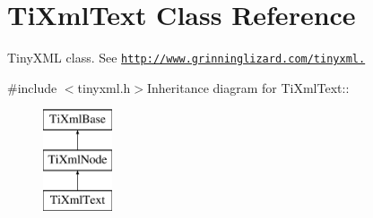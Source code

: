 \hypertarget{class_ti_xml_text}{
\section{TiXmlText Class Reference}
\label{class_ti_xml_text}
}


TinyXML class. See \href{http://www.grinninglizard.com/tinyxml.}{\tt http://www.grinninglizard.com/tinyxml.}  


{\ttfamily \#include $<$tinyxml.h$>$}Inheritance diagram for TiXmlText::\begin{figure}[H]
\begin{center}
\leavevmode
\includegraphics[height=3cm]{class_ti_xml_text}
\end{center}
\end{figure}

